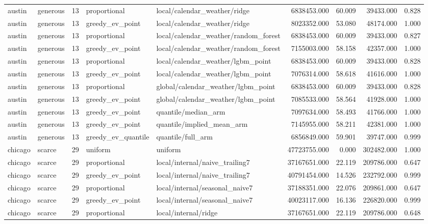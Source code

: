\begin{tabular}{llrllrrrr}
austin & generous & 13 & proportional & local/calendar\_weather/ridge & 6838453.000 & 60.009 & 39433.000 & 0.828 \\
austin & generous & 13 & greedy\_ev\_point & local/calendar\_weather/ridge & 8023352.000 & 53.080 & 48174.000 & 1.000 \\
austin & generous & 13 & proportional & local/calendar\_weather/random\_forest & 6838453.000 & 60.009 & 39433.000 & 0.827 \\
austin & generous & 13 & greedy\_ev\_point & local/calendar\_weather/random\_forest & 7155003.000 & 58.158 & 42357.000 & 1.000 \\
austin & generous & 13 & proportional & local/calendar\_weather/lgbm\_point & 6838453.000 & 60.009 & 39433.000 & 0.828 \\
austin & generous & 13 & greedy\_ev\_point & local/calendar\_weather/lgbm\_point & 7076314.000 & 58.618 & 41616.000 & 1.000 \\
austin & generous & 13 & proportional & global/calendar\_weather/lgbm\_point & 6838453.000 & 60.009 & 39433.000 & 0.828 \\
austin & generous & 13 & greedy\_ev\_point & global/calendar\_weather/lgbm\_point & 7085533.000 & 58.564 & 41928.000 & 1.000 \\
austin & generous & 13 & greedy\_ev\_point & quantile/median\_arm & 7097634.000 & 58.493 & 41766.000 & 1.000 \\
austin & generous & 13 & greedy\_ev\_point & quantile/implied\_mean\_arm & 7145955.000 & 58.211 & 42381.000 & 1.000 \\
austin & generous & 13 & greedy\_ev\_quantile & quantile/full\_arm & 6856849.000 & 59.901 & 39747.000 & 0.999 \\
chicago & scarce & 29 & uniform & uniform & 47723755.000 & 0.000 & 302482.000 & 1.000 \\
chicago & scarce & 29 & proportional & local/internal/naive\_trailing7 & 37167651.000 & 22.119 & 209786.000 & 0.647 \\
chicago & scarce & 29 & greedy\_ev\_point & local/internal/naive\_trailing7 & 40791454.000 & 14.526 & 232792.000 & 0.999 \\
chicago & scarce & 29 & proportional & local/internal/seasonal\_naive7 & 37188351.000 & 22.076 & 209861.000 & 0.647 \\
chicago & scarce & 29 & greedy\_ev\_point & local/internal/seasonal\_naive7 & 40023117.000 & 16.136 & 226820.000 & 0.999 \\
chicago & scarce & 29 & proportional & local/internal/ridge & 37167651.000 & 22.119 & 209786.000 & 0.648 \\

\end{tabular}
